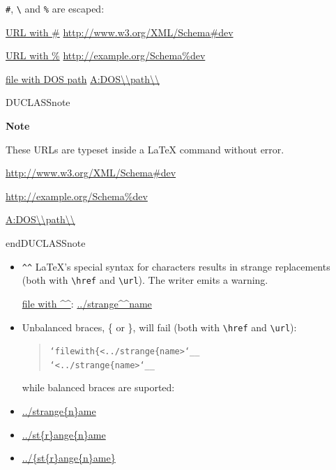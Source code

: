 \documentclass[a4paper]{article}
\newenvironment{DUclass}[1]%
  {%
   \def\DocutilsClassFunctionName{DUCLASS#1}
     \csname \DocutilsClassFunctionName \endcsname}%
  {\csname end\DocutilsClassFunctionName \endcsname}%
\newenvironment{DUadmonition}%
  {\begin{center}
     \begin{lrbox}{\DUadmonitionbox}
       \begin{minipage}{0.9\linewidth}
  }%
  {    \end{minipage}
     \end{lrbox}
     \fbox{\usebox{\DUadmonitionbox}}
   \end{center}
  }
\newenvironment{DUlineblock}[1]{%
    \list{}{\setlength{\partopsep}{\parskip}
            \addtolength{\partopsep}{\baselineskip}
            \setlength{\topsep}{0pt}
            \setlength{\itemsep}{0.15\baselineskip}
            \setlength{\parsep}{0pt}
            \setlength{\leftmargin}{#1}}
    \raggedright
  }
  {\endlist}
\providecommand*{\DUtitle}[1]{%
  \smallskip\noindent\textbf{#1}\smallskip}
\begin{document}
\begin{itemize}
\item \texttt{\#}, \texttt{\textbackslash{}} and \texttt{\%} are escaped:

\begin{DUlineblock}{0em}
\item[] \href{http://www.w3.org/XML/Schema\#dev}{URL with \#}
\url{http://www.w3.org/XML/Schema\#dev}
\item[] \href{http://www.w3.org/XML/Schema\%dev}{URL with \%}
\url{http://example.org/Schema\%dev}
\item[] \href{A:DOS\\path\\}{file with DOS path} \url{A:DOS\\path\\}
\end{DUlineblock}

\begin{DUclass}{note}
\begin{DUadmonition}
\DUtitle{Note}

These URLs are typeset inside a LaTeX command without error.

\begin{DUlineblock}{0em}
\item[] \url{http://www.w3.org/XML/Schema\#dev}
\item[] \url{http://example.org/Schema\%dev}
\item[] \url{A:DOS\\path\\}
\end{DUlineblock}
\end{DUadmonition}
\end{DUclass}
\end{itemize}

\begin{itemize}
\item \texttt{\textasciicircum{}\textasciicircum{}} LaTeX's special syntax for characters results in \textquotedbl{}strange\textquotedbl{} replacements
(both with \texttt{\textbackslash{}href} and \texttt{\textbackslash{}url}). The writer emits a warning.

\href{../strange^^name}{file with \textasciicircum{}\textasciicircum{}}:
\url{../strange^^name}

\item Unbalanced braces, \{ or \}, will fail (both with \texttt{\textbackslash{}href} and \texttt{\textbackslash{}url}):

\begin{quote}
\begin{alltt}
`file with \{ <../strange\{name>`__
`<../strange\{name>`__
\end{alltt}
\end{quote}

while balanced braces are suported:

\begin{DUlineblock}{0em}
\item[] \url{../strange{n}ame}
\item[] \url{../st{r}ange{n}ame}
\item[] \url{../{st{r}ange{n}ame}}
\end{DUlineblock}
\end{itemize}
\end{document}

